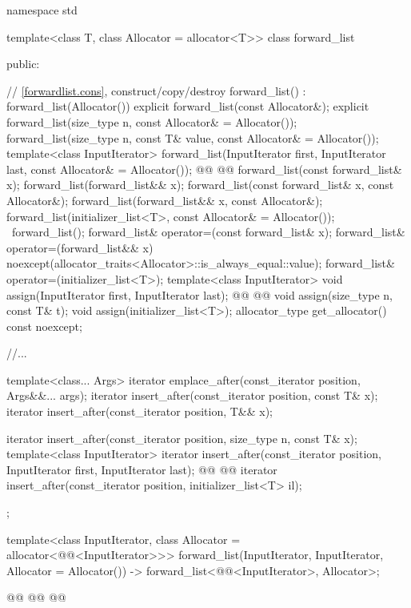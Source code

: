 \documentclass{wg21}
\begin{document}
\begin{codeblock}
namespace std {
    template<class T, class Allocator = allocator<T>>
    class forward_list {
        public:
        
        // \ref{forwardlist.cons}, construct/copy/destroy
        forward_list() : forward_list(Allocator()) { }
        explicit forward_list(const Allocator&);
        explicit forward_list(size_type n, const Allocator& = Allocator());
        forward_list(size_type n, const T& value, const Allocator& = Allocator());
        template<class InputIterator>
        forward_list(InputIterator first, InputIterator last, const Allocator& = Allocator());
        @@
        @@
        forward_list(const forward_list& x);
        forward_list(forward_list&& x);
        forward_list(const forward_list& x, const Allocator&);
        forward_list(forward_list&& x, const Allocator&);
        forward_list(initializer_list<T>, const Allocator& = Allocator());
        ~forward_list();
        forward_list& operator=(const forward_list& x);
        forward_list& operator=(forward_list&& x)
        noexcept(allocator_traits<Allocator>::is_always_equal::value);
        forward_list& operator=(initializer_list<T>);
        template<class InputIterator>
        void assign(InputIterator first, InputIterator last);
        @@
        @@
        void assign(size_type n, const T& t);
        void assign(initializer_list<T>);
        allocator_type get_allocator() const noexcept;
        
        //...
        
        template<class... Args> iterator emplace_after(const_iterator position, Args&&... args);
        iterator insert_after(const_iterator position, const T& x);
        iterator insert_after(const_iterator position, T&& x);
        
        iterator insert_after(const_iterator position, size_type n, const T& x);
        template<class InputIterator>
        iterator insert_after(const_iterator position, InputIterator first, InputIterator last);
        @@
        @@
        iterator insert_after(const_iterator position, initializer_list<T> il);
        
    };
    
    template<class InputIterator, class Allocator = allocator<@@<InputIterator>>>
    forward_list(InputIterator, InputIterator, Allocator = Allocator())
    -> forward_list<@@<InputIterator>, Allocator>;
    
    @@
    @@
    @@
}
\end{codeblock}
\end{document}
